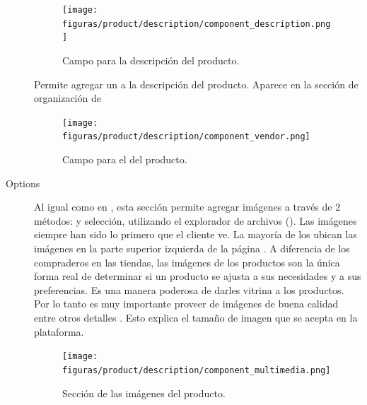 \begin{description}
				\begin{figure}[H]
					\centering
					\texttt{[image: figuras/product/description/component\_description.png]}

					\caption{Campo para la descripción del producto.}
					\label{figure:product:description:component_description}
				\end{figure}

			\item [\vendorForm]
				Permite agregar un \vendorForm a la descripción del producto. Aparece en la sección de organización de \shopifyNAME {}

				\begin{figure}[H]
					\centering
					\texttt{[image: figuras/product/description/component\_vendor.png]}

					\caption{Campo para el \vendorForm del producto.}
					\label{figure:product:description:component_vendor}
				\end{figure}

			\item [Options]
				
			\item [\multimediaForm]
				Al igual como en \shopifyNAME {}, esta sección permite agregar imágenes a través de 2 métodos: \dragdrop y selección, utilizando el explorador de archivos ().
				Las imágenes siempre han sido lo primero que el cliente ve. La mayoría de los \websitesINT ubican las imágenes en la parte superior izquierda de la página \cite{online_cxpartners_official_people_see_to_buy}.
				A diferencia de los compraderos en las tiendas, las imágenes de los productos son la única forma real de determinar si un producto se ajusta a sus necesidades y a sus preferencias. Es una manera poderosa de darles vitrina a los productos. Por lo tanto es muy importante proveer de imágenes de buena calidad entre otros detalles \cite{online_cxpartners_official_people_see_to_buy}. Esto explica el tamaño de imagen que se acepta en la plataforma.

				\begin{figure}[H]
					\centering
					\texttt{[image: figuras/product/description/component\_multimedia.png]}

					\caption{Sección de las imágenes del producto.}
					\label{figure:product:description:component_multimedia}
				\end{figure}
				

\end{description}
